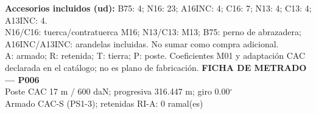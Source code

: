 \begingroup\scriptsize
\textbf{Accesorios incluidos (ud):} B75: 4; N16: 23; A16INC: 4; C16: 7; N13: 4; C13: 4; A13INC: 4.\\
N16/C16: tuerca/contratuerca M16; N13/C13: M13; B75: perno de abrazadera; A16INC/A13INC: arandelas incluidas. No sumar como compra adicional.\\
A: armado; R: retenida; T: tierra; P: poste. Coeficientes M01 y adaptación CAC declarada en el catálogo; no es plano de fabricación.
\endgroup\endgroup
\clearpage{}
\begingroup\small\setlength{\parskip}{3pt}\renewcommand{\arraystretch}{1.05}
\textbf{\large FICHA DE METRADO — P006}\\[4pt]
Poste CAC 17 m / 600 daN; progresiva 316.447 m; giro 0.00\ensuremath{^\circ}\\
Armado CAC-S (PS1-3); retenidas RI-A: 0 ramal(es)\\
\begingroup\scriptsize
